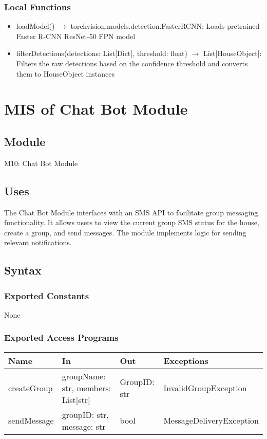 \documentclass[12pt, titlepage]{article}
\begin{document}
\subsubsection{Local Functions}

\begin{itemize}
  \item loadModel() $\rightarrow$ torchvision.models.detection.FasterRCNN: Loads pretrained Faster R-CNN ResNet-50 FPN model
  \item filterDetections(detections: List[Dict], threshold: float) $\rightarrow$ List[HouseObject]: Filters the raw detections based on the confidence threshold and converts them to HouseObject instances
\end{itemize}

\newpage
 
\section{MIS of Chat Bot Module} \label{Module}

\subsection{Module}

M10: Chat Bot Module

\subsection{Uses}

The Chat Bot Module interfaces with an SMS API to facilitate group messaging functionality. It allows users to view the current group SMS status for the house, create a group, and send messages. The module implements logic for sending relevant notifications.

\subsection{Syntax}

\subsubsection{Exported Constants}
None

\subsubsection{Exported Access Programs}

\begin{center}
\begin{tabular}{p{3cm} p{5cm} p{3cm} p{5cm}}
\hline
\textbf{Name} & \textbf{In} & \textbf{Out} & \textbf{Exceptions} \\
\hline
createGroup & groupName: str, members: List[str] & GroupID: str & InvalidGroupException \\
\hline
sendMessage & groupID: str, message: str & bool & MessageDeliveryException \\
\hline
\end{tabular}
\end{center}
\end{document}
